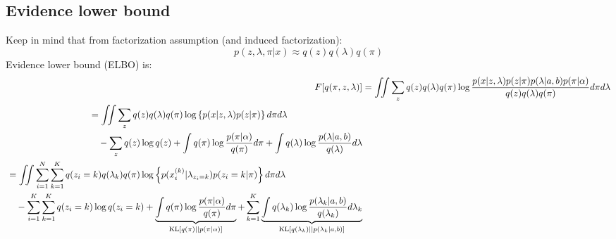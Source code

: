 \documentclass[a4paper,10.5pt,dvipdfmx]{jarticle}  %
\begin{document}
\subsection{Evidence lower bound}
\noindent
Keep in mind that from factorization assumption (and induced factorization):
\begin{equation}
	p(z, \lambda, \pi | x) \approx q(z) q(\lambda) q(\pi)
\end{equation}
\noindent
Evidence lower bound (ELBO) is:
\begin{align}
	F[q(\pi, z, \lambda)] &= \iint \sum_{z} q(z) q(\lambda) q(\pi) \log \frac{p(x|z,\lambda) p(z|\pi) p(\lambda|a,b) p(\pi | \alpha)}{q(z)q(\lambda)q(\pi)} d\pi d\lambda\\
\begin{split}
&= \iint \sum_{z} q(z) q(\lambda) q(\pi) \log \left\{p(x|z, \lambda) p(z|\pi) \right\} d\pi d\lambda \\ &\quad - \sum_{z} q(z) \log q(z) + \int q(\pi) \log \frac{p(\pi | \alpha)}{q(\pi)} d\pi + \int q(\lambda) \log \frac{p(\lambda|a,b)}{q(\lambda)} d\lambda
\end{split}\\
\begin{split}
	&= \iint \sum_{i=1}^{N} \sum_{k=1}^{K} q(z_i = k) q(\lambda_k) q(\pi) \log \left\{p(x_{i}^{(k)}|\lambda_{z_i=k}) p(z_i = k|\pi) \right\} d\pi d\lambda \\ &\quad - \sum_{i=1}^{K} \sum_{k=1}^{K} q(z_i = k) \log q(z_i=k) + \underbrace{  \int q(\pi) \log \frac{p(\pi | \alpha)}{q(\pi)} d\pi  }_{{\rm KL}[q(\pi) || p(\pi|\alpha)]} + \sum_{k=1}^{K} \underbrace{ \int q(\lambda_k) \log \frac{ p(\lambda_k | a, b)}{ q(\lambda_k) } d \lambda_k  }_{ {\rm KL}[q(\lambda_k) || p(\lambda_k | a, b)]    } 
\end{split}
\end{align}
\end{document}
